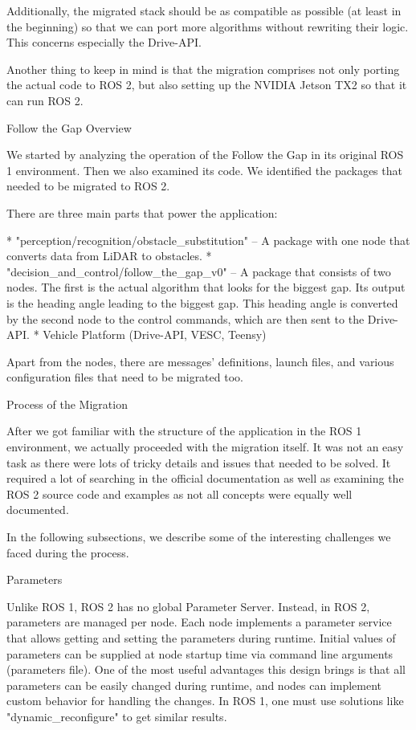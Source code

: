 Additionally, the migrated stack should be as compatible as possible (at least in the beginning) so that we can port more algorithms without rewriting their logic. This concerns especially the Drive-API.

Another thing to keep in mind is that the migration comprises not only porting the actual code to ROS 2, but also setting up the NVIDIA Jetson TX2 so that it can run ROS 2.


\sec Follow the Gap Overview

We started by analyzing the operation of the Follow the Gap in its original ROS 1 environment. Then we also examined its code. We identified the packages that needed to be migrated to ROS 2.

There are three main parts that power the application:

\begitems
* "perception/recognition/obstacle_substitution" – A package with one node that converts data from LiDAR to obstacles.
* "decision_and_control/follow_the_gap_v0" – A package that consists of two nodes. The first is the actual algorithm that looks for the biggest gap. Its output is the heading angle leading to the biggest gap. This heading angle is converted by the second node to the control commands, which are then sent to the Drive-API.
* Vehicle Platform (Drive-API, VESC, Teensy)
\enditems

Apart from the nodes, there are messages' definitions, launch files, and various configuration files that need to be migrated too.


\sec Process of the Migration

After we got familiar with the structure of the application in the ROS 1 environment, we actually proceeded with the migration itself. It was not an easy task as there were lots of tricky details and issues that needed to be solved. It required a lot of searching in the official documentation as well as examining the ROS 2 source code and examples as not all concepts were equally well documented.

In the following subsections, we describe some of the interesting challenges we faced during the process.

\secc Parameters

Unlike ROS 1, ROS 2 has no global Parameter Server. Instead, in ROS 2, parameters are managed per node. Each node implements a parameter service that allows getting and setting the parameters during runtime. Initial values of parameters can be supplied at node startup time via command line arguments (parameters file). One of the most useful advantages this design brings is that all parameters can be easily changed during runtime, and nodes can implement custom behavior for handling the changes. In ROS 1, one must use solutions like "dynamic_reconfigure" to get similar results.

